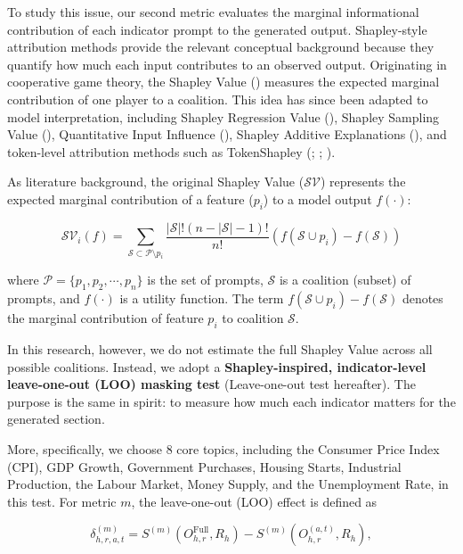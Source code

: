 To study this issue, our second metric evaluates the marginal informational contribution of each indicator prompt to the generated output. Shapley-style attribution methods provide the relevant conceptual background because they quantify how much each input contributes to an observed output. Originating in cooperative game theory, the Shapley Value (\cite{shapley1953value}) measures the expected marginal contribution of one player to a coalition. This idea has since been adapted to model interpretation, including Shapley Regression Value (\cite{lipovetsky2001analysis}), Shapley Sampling Value (\cite{vstrumbelj2014explaining}), Quantitative Input Influence (\cite{datta2016algorithmic}), Shapley Additive Explanations (\cite{lundberg2017unified}), and token-level attribution methods such as TokenShapley (\cite{liu2023prompt}; \cite{mohammadi2024wait}; \cite{goldshmidt2024tokenshap}).




As literature background, the original Shapley Value ($\mathcal{SV}$) represents the expected marginal contribution of a feature ($p_i$) to a model output $f(\cdot)$:

\begin{equation*}
  \mathcal{SV}_i(f) = \sum_{\mathcal{S} \subset \mathcal{P}\setminus p_i} \frac{\left|\mathcal{S}\right|! (n - \left|\mathcal{S}\right| - 1)!}{n!} \left(f(\mathcal{S}\cup p_i) - f(\mathcal{S})\right)
\end{equation*}

where $\mathcal{P}=\{p_1, p_2, \cdots, p_n\}$ is the set of prompts, $\mathcal{S}$ is a coalition (subset) of prompts, and $f(\cdot)$ is a utility function. The term $f(\mathcal{S}\cup p_i)-f(\mathcal{S})$ denotes the marginal contribution of feature $p_i$ to coalition $\mathcal{S}$.


In this research, however, we do not estimate the full Shapley Value across all possible coalitions. Instead, we adopt a \textbf{Shapley-inspired, indicator-level leave-one-out (LOO) masking test} (Leave-one-out test hereafter). The purpose is the same in spirit: to measure how much each indicator matters for the generated section. 


More, specifically, we choose 8 core topics, including the Consumer Price Index (CPI), GDP Growth, Government Purchases, Housing Starts, Industrial Production, the Labour Market, Money Supply, and the Unemployment Rate, in this test. For metric \(m\), the leave-one-out (LOO) effect is defined as 

\begin{equation}\label{eq:ch2:loo}
    \delta^{(m)}_{h,r,a,t}=S^{(m)}(O^{\mathrm{Full}}_{h,r},R_h)-S^{(m)}(O^{(a,t)}_{h,r},R_h), 
\end{equation}


